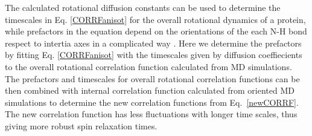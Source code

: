 \documentclass[pre,aps,floatfix,authordate1-4,twocolumn]{revtex4-1}
\begin{document}
The calculated rotational diffusion constants can be used to determine
the timescales in Eq. \ref{CORRFanisot} for the overall rotational
dynamics of a protein, while prefactors in the equation depend on the
orientations of the each N-H bond respect to intertia axes in a complicated way \cite{woessner62,luginbuhl97}.
Here we determine the prefactors by fitting Eq. \ref{CORRFanisot} with the timescales
given by diffusion coeffiecients to the overall rotational correlation function
calculated from MD simulations. The prefactors and timescales for overall
rotational correlation functions can be then combined with internal
correlation function calculated from oriented MD simulations to determine
the new correlation functions from Eq.~\ref{newCORRF}. The 
new correlation function has less fluctuations with longer time
scales, thus giving more robust spin relaxation times. 
\end{document}
